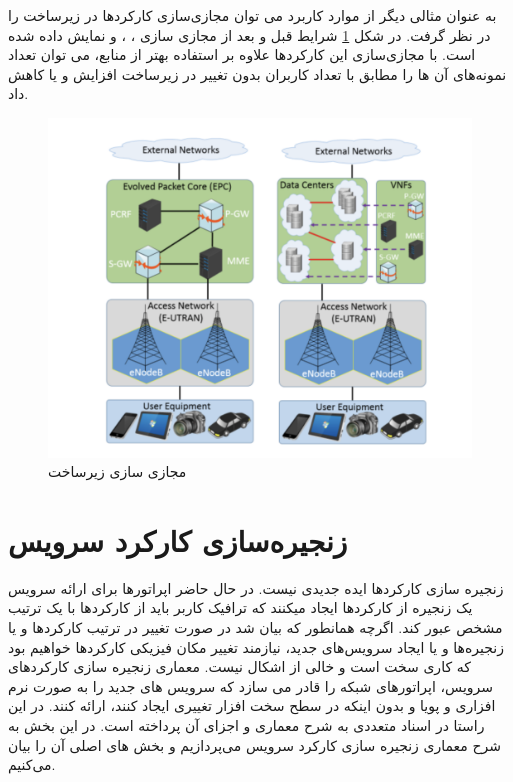 به عنوان مثالی دیگر از موارد کاربرد می توان مجازی‌سازی کارکردها در زیرساخت  را در نظر گرفت.
در شکل \ref{fig.21} شرایط قبل و بعد از مجازی سازی
، ،  و 
نمایش داده شده است.
با مجازی‌سازی این کارکردها علاوه بر استفاده بهتر از منابع، می توان تعداد نمونه‌های آن ها را مطابق با تعداد کاربران بدون تغییر در زیرساخت افزایش و یا کاهش داد.

\begin{figure}[h!]
\center\includegraphics[scale=.5]{images/lte}
\caption{مجازی سازی زیرساخت }
\label{fig.21}
\end{figure}

\section{زنجیره‌سازی کارکرد سرویس}

زنجیره سازی کارکردها ایده جدیدی نیست.
در حال حاضر اپراتورها برای ارائه سرویس یک زنجیره از کارکردها ایجاد میکنند که ترافیک کاربر باید از کارکردها با یک ترتیب مشخص عبور کند.
اگرچه همانطور که بیان شد در صورت تغییر در ترتیب کارکردها و یا زنجیره‌ها و یا ایجاد سرویس‌های جدید، نیازمند تغییر مکان فیزیکی کارکردها خواهیم بود
که کاری سخت است و خالی از اشکال نیست.
معماری زنجیره سازی کارکردهای سرویس، اپراتورهای شبکه را قادر می سازد که سرویس های جدید را به صورت نرم افزاری و پویا و بدون اینکه در سطح سخت افزار تغییری ایجاد کنند، ارائه کنند.
در این راستا  در اسناد متعددی به شرح معماری و اجزای آن پرداخته است.
در این بخش به شرح معماری زنجیره سازی کارکرد سرویس می‌پردازیم و بخش های اصلی آن را بیان می‌کنیم.

